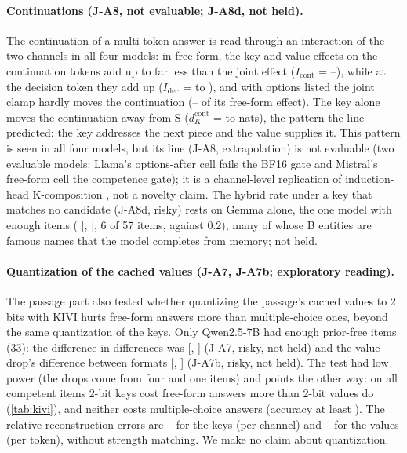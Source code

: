 \paragraph{Continuations (J-A8, not evaluable; J-A8d, not held).} The continuation of a multi-token answer is read through an interaction of the two channels in all four models: in free form, the key and value effects on the continuation tokens add up to far less than the joint effect ($I_{\mathrm{cont}}$ = \JaIcontMin{}--\JaIcontMax{}), while at the decision token they add up ($I_{\mathrm{dec}}$ = \JaIdecMin{} to \JaIdecMax{}), and with options listed the joint clamp hardly moves the continuation (\JaContRatioMin{}--\JaContRatioMax{} of its free-form effect). The key alone moves the continuation away from S ($d_K^{\mathrm{cont}}$ = \JaDcontKMin{} to \JaDcontKMax{} nats), the pattern the line predicted: the key addresses the next piece and the value supplies it. This pattern is seen in all four models, but its line (J-A8, extrapolation) is not evaluable (two evaluable models: Llama's options-after cell fails the BF16 gate and Mistral's free-form cell the competence gate); it is a channel-level replication of induction-head K-composition \citep{elhage2021framework,olsson2022context}, not a novelty claim. The hybrid rate under a key that matches no candidate (J-A8d, risky) rests on Gemma alone, the one model with enough items (\JaEightdNomGemmaNine{} [\JaEightdNomGemmaNineLo{}, \JaEightdNomGemmaNineHi{}], 6 of 57 items, against 0.2), many of whose B entities are famous names that the model completes from memory; not held. %

\paragraph{Quantization of the cached values (J-A7, J-A7b; exploratory reading).} The passage part also tested whether quantizing the passage's cached values to 2 bits with KIVI \citep{liu2024kivi} hurts free-form answers more than multiple-choice ones, beyond the same quantization of the keys. Only Qwen2.5-7B had enough prior-free items (33): the difference in differences was \JaSevenDiDQwenSeven{} [\JaSevenDiDQwenSevenLo{}, \JaSevenDiDQwenSevenHi{}] (J-A7, risky, not held) and the value drop's difference between formats \JaSevenbDiffQwenSeven{} [\JaSevenbDiffQwenSevenLo{}, \JaSevenbDiffQwenSevenHi{}] (J-A7b, risky, not held). The test had low power (the drops come from four and one items) and points the other way: on all competent items 2-bit keys cost free-form answers more than 2-bit values do (\cref{tab:kivi}), and neither costs multiple-choice answers (accuracy at least \JaKiviMcqMin{}). The relative reconstruction errors are \JaKiviErrKMin{}--\JaKiviErrKMax{} for the keys (per channel) and \JaKiviErrVMin{}--\JaKiviErrVMax{} for the values (per token), without strength matching. We make no claim about quantization. %

